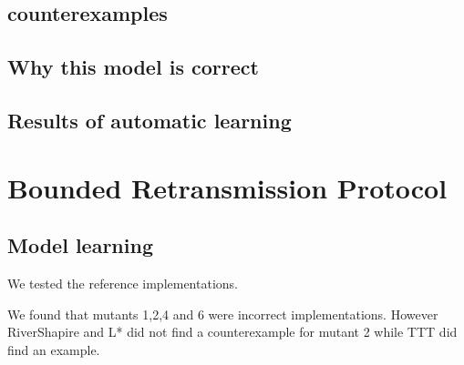 \documentclass[11pt,a4paper]{article}
\begin{document}
\subsection{counterexamples}

\subsection{Why this model is correct}



\subsection{Results of automatic learning}



\section{Bounded Retransmission Protocol}

\subsection{Model learning}
We tested the reference implementations.

We found that mutants 1,2,4 and 6 were incorrect implementations.
However RiverShapire and L* did not find a counterexample for mutant 2
while TTT did find an example.
\end{document}
